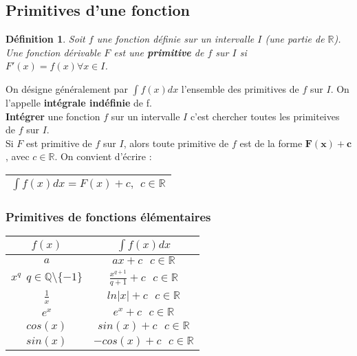 \documentclass[12pt, a4paper]{book}
\newtheorem*{definition}{Définition}
\begin{document}
\subsection{Primitives d'une fonction}
\begin{definition}
    Soit $f$ une fonction définie sur un intervalle $I$ (une partie de $\mathbb{R}$). Une fonction dérivable $F$ est une \textbf{primitive} de $f$ sur $I$ si\\
     $F'(x) = f(x) \forall x \in I$.
\end{definition}
On désigne généralement par $\int f(x)dx$ l'ensemble des primitives de $f$ sur $I$. On l'appelle \textbf{intégrale indéfinie} de f.\\
\textbf{Intégrer} une fonction $f$ sur un intervalle $I$ c'est chercher toutes les primiteives de $f$ sur $I$.\\
Si $F$ est primitive de $f$ sur $I$, alors toute primitive de $f$ est de la forme $\mathbf{F(x)+c}$, avec $c \in \mathbb{R}$. On convient d'écrire :\\
\begin{center}
    \begin{tabular}{ |c|}
        \hline
       $\int f(x)dx = F(x)+c, \ \ c \in \mathbb{R}$\\
        \hline
    \end{tabular}
\end{center}
\subsubsection{Primitives de fonctions élémentaires}
\begin{center}
    \begin{tabular}{|c|c|}
        \hline
       $f(x)$ & $\int f(x)dx$\\
        \hline
        $a$ & $ax+c \ \ \ c \in \mathbb{R}$\\
        $x^q \ \ q \in \mathbb{Q} \setminus \{-1\}$ & $\frac{x^{q+1}}{q+1}+c \ \ \ c \in \mathbb{R}$\\
        $\frac{1}{x}$ & $ln \lvert x \rvert + c \ \ \ c \in \mathbb{R}$\\
        $e^x$ & $e^x + c \ \ \ c \in \mathbb{R}$\\
        $cos(x)$ & $sin(x)+c \ \ \ c \in \mathbb{R}$\\
        $sin(x)$ & $-cos(x)+c \ \ \ c \in \mathbb{R}$\\
        \hline
    \end{tabular}
\end{center}
\end{document}
